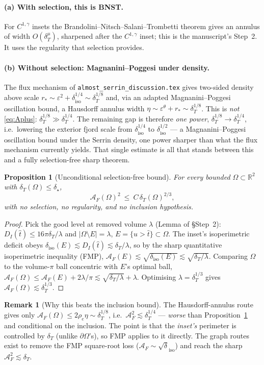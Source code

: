 \documentclass[11pt]{article}
\newtheorem{proposition}[theorem]{Proposition}
\theoremstyle{definition}
\newtheorem{remark}[theorem]{Remark}
\newcommand{\R}{\mathbb R}
\newcommand{\Om}{\Omega}
\newcommand{\eps}{\varepsilon}
\newcommand{\dT}{\delta_T}
\newcommand{\diso}{\delta_{\mathrm{iso}}}
\newcommand{\AF}{\mathcal A_F}
\newcommand{\rstar}{r_*}
\newcommand{\abs}[1]{\left|#1\right|}
\begin{document}
\paragraph{(a) With selection, this is BNST.} For $C^{1,\gamma}$ insets the
Brandolini--Nitsch--Salani--Trombetti theorem gives an annulus of width
$O(\dT^{\mu})$, sharpened after the $C^{1,\gamma}$ inset; this is the
manuscript's Step~2. It uses the regularity that selection provides.

\paragraph{(b) Without selection: Magnanini--Poggesi under density.} The
flux mechanism of \texttt{almost\_serrin\_discussion.tex} gives two-sided
density above scale $\rstar\sim\eps^2+\diso^{1/4}\sim\dT^{1/8}$ and, via an
adapted Magnanini--Poggesi oscillation bound, a Hausdorff annulus width
$\eta\sim\eps^\theta+\rstar\sim\dT^{1/8}$. This is \emph{not}
\eqref{eq:Aplus}: $\dT^{1/8}\gg\dT^{1/4}$. The remaining gap is therefore
\emph{one power}, $\dT^{1/8}\to\dT^{1/4}$, i.e.\ lowering the exterior fjord
scale from $\diso^{1/4}$ to $\diso^{1/2}$ --- a Magnanini--Poggesi
oscillation bound under the Serrin density, one power sharper than what the
flux mechanism currently yields. That single estimate is all that stands
between this and a fully selection-free sharp theorem.

\begin{proposition}[Unconditional selection-free bound]\label{prop:nonsharp}
For every bounded $\Om\subset\R^2$ with $\dT(\Om)\le\delta_\star$,
\[
   \AF(\Om)^2\ \le\ C\,\dT(\Om)^{2/3},
\]
with no selection, no regularity, and no inclusion hypothesis.
\end{proposition}

\begin{proof}
Pick the good level at removed volume $\lambda$
(Lemma of \S Step~2): $D_I(\hat t)\le 16\pi\dT/\lambda$ and
$\abs{\Om\setminus E}=\lambda$, $E=\{u>\hat t\}\subset\Om$. The inset's
isoperimetric deficit obeys $\diso(E)\lesssim D_I(\hat t)\lesssim\dT/\lambda$,
so by the sharp quantitative isoperimetric inequality (FMP),
$\AF(E)\lesssim\sqrt{\diso(E)}\lesssim\sqrt{\dT/\lambda}$. Comparing $\Om$
to the volume-$\pi$ ball concentric with $E$'s optimal ball,
$\AF(\Om)\le\AF(E)+2\lambda/\pi\lesssim\sqrt{\dT/\lambda}+\lambda$.
Optimising $\lambda=\dT^{1/3}$ gives $\AF(\Om)\lesssim\dT^{1/3}$.
\end{proof}

\begin{remark}[Why this beats the inclusion bound]\label{rem:nonsharp}
The Hausdorff-annulus route gives only $\AF(\Om)\le2\rho_e\eta\sim
\dT^{1/8}$, i.e.\ $\AF^2\lesssim\dT^{1/4}$ --- \emph{worse} than
Proposition~\ref{prop:nonsharp} and conditional on the inclusion. The point
is that the \emph{inset's} perimeter is controlled by $\dT$
(unlike $\partial\Om$'s), so FMP applies to it directly. The graph routes
exist to remove the FMP square-root loss ($\AF\sim\sqrt\diso$) and reach the
sharp $\AF^2\lesssim\dT$.
\end{remark}
\end{document}
